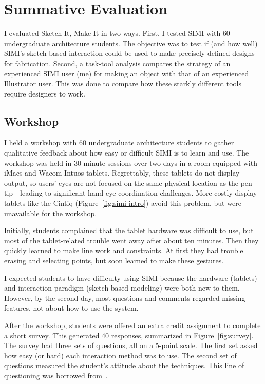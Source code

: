 \chapter{Summative Evaluation}

I evaluated Sketch It, Make It in two ways. First, I tested SIMI
with 60 undergraduate architecture students. The objective was to test
if (and how well) SIMI's sketch-based interaction could be used to
make precisely-defined designs for fabrication. Second, a task-tool
analysis compares the strategy of an experienced SIMI user (me) for
making an object with that of an experienced Illustrator user. This
was done to compare how these starkly different tools require
designers to work.



\section{Workshop}

I held a workshop with 60 undergraduate architecture students to
gather qualitative feedback about how easy or difficult SIMI is to
learn and use. The workshop was held in 30-minute sessions over two
days in a room equipped with iMacs and Wacom Intuos
tablets. Regrettably, these tablets do not display output, so users'
eyes are not focused on the same physical location as the pen
tip---leading to significant hand-eye coordination challenges. More
costly display tablets like the Cintiq (Figure~\ref{fig:simi-intro})
avoid this problem, but were unavailable for the workshop.

Initially, students complained that the tablet hardware was difficult
to use, but most of the tablet-related trouble went away after about
ten minutes. Then they quickly learned to make line work and
constraints. At first they had trouble erasing and selecting points,
but soon learned to make these gestures.

I expected students to have difficulty using SIMI because the hardware
(tablets) and interaction paradigm (sketch-based modeling) were both
new to them. However, by the second day, most questions and comments
regarded missing features, not about how to use the system.

After the workshop, students were offered an extra credit assignment
to complete a short survey. This generated 40 responses, summarized in
Figure~\ref{fig:survey}. The survey had three sets of questions, all
on a 5-point scale. The first set asked how easy (or hard) each
interaction method was to use. The second set of questions measured
the student's attitude about the techniques. This line of questioning
was borrowed from~\cite{bae-everybody}.

